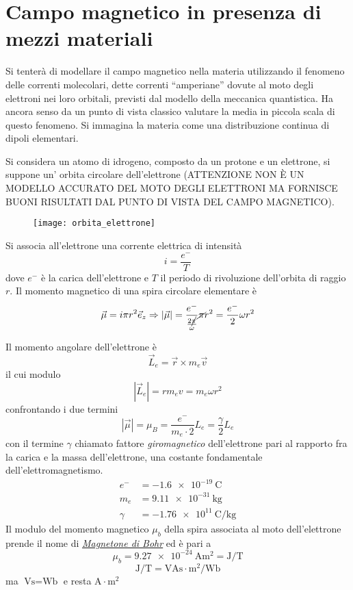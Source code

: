 \newpage
\section{Campo magnetico in presenza di mezzi materiali}
Si tenterà di modellare il campo magnetico nella materia utilizzando il fenomeno
delle correnti molecolari, dette correnti ``amperiane'' dovute al moto
degli elettroni nei loro orbitali, previsti dal modello della meccanica quantistica.
Ha ancora senso da un punto di vista classico valutare la media in piccola scala di questo 
fenomeno. 
Si immagina la materia come una distribuzione continua di dipoli elementari.

Si considera un atomo di idrogeno, composto da un protone e un elettrone, si suppone
un' orbita circolare dell'elettrone (ATTENZIONE NON È UN MODELLO ACCURATO DEL MOTO DEGLI ELETTRONI MA FORNISCE BUONI RISULTATI DAL PUNTO DI VISTA DEL CAMPO MAGNETICO).
\begin{figure}[H]
\centering
\texttt{[image: orbita\_elettrone]}
\end{figure}
Si associa all'elettrone una corrente elettrica di intensità
$$
i = \frac{e^-}{T}
$$
dove $e^-$ è la carica dell'elettrone e $T$ il periodo di rivoluzione dell'orbita di raggio $r$.
Il momento magnetico di una spira circolare elementare è 
$$
\vec{\mu} = i \pi r^2 \vec{e}_z \Rightarrow \left|\vec{\mu}\right| = \frac{e^-}{\frac{2\cancel{\pi}}{\omega}}\cancel{\pi} r^2 = \frac{e^-}{2}\omega r^2
$$

Il momento angolare dell'elettrone è 
$$
\vec{L}_e = \vec{r} \times m_e \vec{v}
$$
il cui modulo
$$
\left|\vec{L}_e\right| = r m_e v = m_e \omega r^2
$$
confrontando i due termini 
$$
\left|\vec{\mu}\right| = \mu_B = \frac{e^-}{m_e\cdot 2} L_e = \frac{\gamma}{2}L_e
$$
con il termine $\gamma$ chiamato fattore \textit{giromagnetico} dell'elettrone pari al 
rapporto fra la carica e la massa dell'elettrone, una costante fondamentale 
dell'elettromagnetismo.
\begin{align*}
e^- &= \SI{-1.6e-19}{\coulomb}\\
m_e & = \SI{9.11e-31}{\kilo\gram} \\
\gamma &= \SI{-1.76e11}{\coulomb\per\kilo\gram}
\end{align*}
Il modulo del momento magnetico $\mu_b$ della spira associata al moto dell'elettrone prende il
nome di \href{https://it.wikipedia.org/wiki/Magnetone_di_Bohr}{\textit{Magnetone di Bohr}}
ed è pari a 
$$
\mu_b = \SI{9.27e-24}{\ampere\meter^2} = \si{\joule\per\tesla}
$$
$$
\si{\joule\per\tesla} = \si{\volt\ampere\second}\cdot\si{\meter^2\per\weber}
$$
ma $\si{\volt\second} = \si{\weber}$ e resta $\si{\ampere} \cdot \si{\meter^2}$

